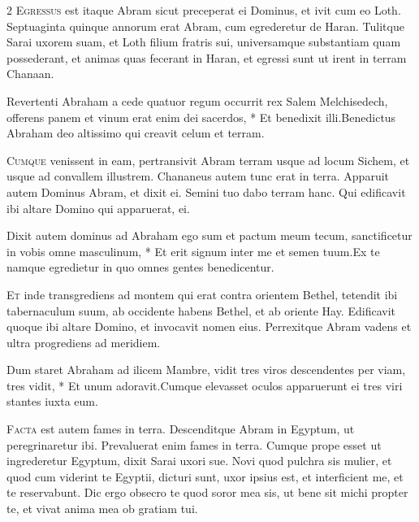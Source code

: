 \begin{multicols*}{2}
\lettrine[lines=2]{\zallmancaps \color{Blue} E}{gressus} est itaque Abram sicut preceperat ei Dominus, et ivit cum eo Loth. Septuaginta quinque annorum erat Abram, cum egrederetur de Haran. Tulitque Sarai uxorem suam, et Loth filium fratris sui, universamque substantiam quam possederant, et animas quas fecerant in Haran, et egressi sunt ut irent in terram Chanaan.
\begin{responsory}
{Revertenti Abraham a cede quatuor regum occurrit rex Salem Melchisedech, offerens panem et vinum erat enim dei sacerdos, * Et benedixit illi.}{Benedictus Abraham deo altissimo qui creavit celum et terram.}
\end{responsory}%
\lettrine[lines=2]{\zallmancaps \color{Red} C}{umque} venissent in eam, pertransivit Abram terram usque ad locum Sichem, et usque ad convallem illustrem. Chananeus autem tunc erat in terra. Apparuit autem Dominus Abram, et dixit ei. Semini tuo dabo terram hanc. Qui edificavit ibi altare Domino qui apparuerat, ei.
\begin{responsory-doxology}
{Dixit autem dominus ad Abraham ego sum et pactum meum tecum, sanctificetur in vobis omne masculinum, * Et erit signum inter me et semen tuum.}{Ex te namque egredietur in quo omnes gentes benedicentur.}
\end{responsory-doxology}%
\lettrine[lines=2]{\zallmancaps \color{Blue} E}{t} inde transgrediens ad montem qui erat contra orientem Bethel, tetendit ibi tabernaculum suum, ab occidente habens Bethel, et ab oriente Hay. Edificavit quoque ibi altare Domino, et invocavit nomen eius. Perrexitque Abram vadens et ultra progrediens ad meridiem.
\begin{responsory}
{Dum staret Abraham ad ilicem Mambre, vidit tres viros descendentes per viam, tres vidit, * Et unum adoravit.}{Cumque elevasset oculos apparuerunt ei tres viri stantes iuxta eum.}
\end{responsory}%
\lettrine[lines=2]{\zallmancaps \color{Red} F}{acta} est autem fames in terra. Descenditque Abram in Egyptum, ut peregrinaretur ibi. Prevaluerat enim fames in terra. Cumque prope esset ut ingrederetur Egyptum, dixit Sarai uxori sue. Novi quod pulchra sis mulier, et quod cum viderint te Egyptii, dicturi sunt, uxor ipsius est, et interficient me, et te reservabunt. Dic ergo obsecro te quod soror mea sis, ut bene sit michi propter te, et vivat anima mea ob gratiam tui.

\end{multicols*}
